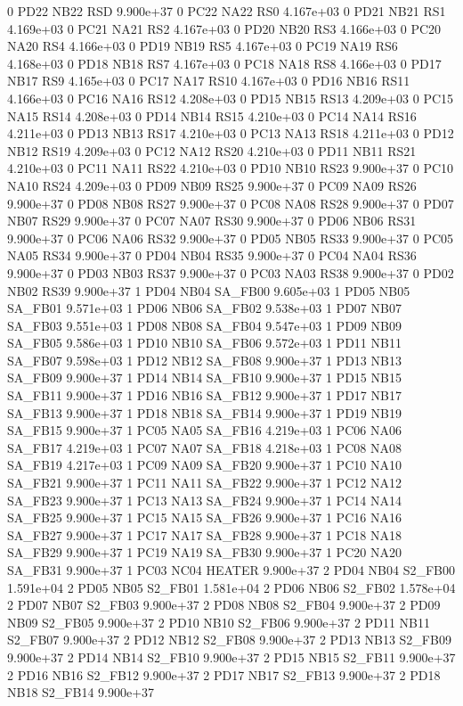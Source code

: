 0 PD22 NB22 RSD 9.900e+37 
0 PC22 NA22 RS0 4.167e+03 
0 PD21 NB21 RS1 4.169e+03 
0 PC21 NA21 RS2 4.167e+03 
0 PD20 NB20 RS3 4.166e+03 
0 PC20 NA20 RS4 4.166e+03 
0 PD19 NB19 RS5 4.167e+03 
0 PC19 NA19 RS6 4.168e+03 
0 PD18 NB18 RS7 4.167e+03 
0 PC18 NA18 RS8 4.166e+03 
0 PD17 NB17 RS9 4.165e+03 
0 PC17 NA17 RS10 4.167e+03 
0 PD16 NB16 RS11 4.166e+03 
0 PC16 NA16 RS12 4.208e+03 
0 PD15 NB15 RS13 4.209e+03 
0 PC15 NA15 RS14 4.208e+03 
0 PD14 NB14 RS15 4.210e+03 
0 PC14 NA14 RS16 4.211e+03 
0 PD13 NB13 RS17 4.210e+03 
0 PC13 NA13 RS18 4.211e+03 
0 PD12 NB12 RS19 4.209e+03 
0 PC12 NA12 RS20 4.210e+03 
0 PD11 NB11 RS21 4.210e+03 
0 PC11 NA11 RS22 4.210e+03 
0 PD10 NB10 RS23 9.900e+37 
0 PC10 NA10 RS24 4.209e+03 
0 PD09 NB09 RS25 9.900e+37 
0 PC09 NA09 RS26 9.900e+37 
0 PD08 NB08 RS27 9.900e+37 
0 PC08 NA08 RS28 9.900e+37 
0 PD07 NB07 RS29 9.900e+37 
0 PC07 NA07 RS30 9.900e+37 
0 PD06 NB06 RS31 9.900e+37 
0 PC06 NA06 RS32 9.900e+37 
0 PD05 NB05 RS33 9.900e+37 
0 PC05 NA05 RS34 9.900e+37 
0 PD04 NB04 RS35 9.900e+37 
0 PC04 NA04 RS36 9.900e+37 
0 PD03 NB03 RS37 9.900e+37 
0 PC03 NA03 RS38 9.900e+37 
0 PD02 NB02 RS39 9.900e+37 
1 PD04 NB04 SA_FB00 9.605e+03 
1 PD05 NB05 SA_FB01 9.571e+03 
1 PD06 NB06 SA_FB02 9.538e+03 
1 PD07 NB07 SA_FB03 9.551e+03 
1 PD08 NB08 SA_FB04 9.547e+03 
1 PD09 NB09 SA_FB05 9.586e+03 
1 PD10 NB10 SA_FB06 9.572e+03 
1 PD11 NB11 SA_FB07 9.598e+03 
1 PD12 NB12 SA_FB08 9.900e+37 
1 PD13 NB13 SA_FB09 9.900e+37 
1 PD14 NB14 SA_FB10 9.900e+37 
1 PD15 NB15 SA_FB11 9.900e+37 
1 PD16 NB16 SA_FB12 9.900e+37 
1 PD17 NB17 SA_FB13 9.900e+37 
1 PD18 NB18 SA_FB14 9.900e+37 
1 PD19 NB19 SA_FB15 9.900e+37 
1 PC05 NA05 SA_FB16 4.219e+03 
1 PC06 NA06 SA_FB17 4.219e+03 
1 PC07 NA07 SA_FB18 4.218e+03 
1 PC08 NA08 SA_FB19 4.217e+03 
1 PC09 NA09 SA_FB20 9.900e+37 
1 PC10 NA10 SA_FB21 9.900e+37 
1 PC11 NA11 SA_FB22 9.900e+37 
1 PC12 NA12 SA_FB23 9.900e+37 
1 PC13 NA13 SA_FB24 9.900e+37 
1 PC14 NA14 SA_FB25 9.900e+37 
1 PC15 NA15 SA_FB26 9.900e+37 
1 PC16 NA16 SA_FB27 9.900e+37 
1 PC17 NA17 SA_FB28 9.900e+37 
1 PC18 NA18 SA_FB29 9.900e+37 
1 PC19 NA19 SA_FB30 9.900e+37 
1 PC20 NA20 SA_FB31 9.900e+37 
1 PC03 NC04 HEATER 9.900e+37 
2 PD04 NB04 S2_FB00 1.591e+04 
2 PD05 NB05 S2_FB01 1.581e+04 
2 PD06 NB06 S2_FB02 1.578e+04 
2 PD07 NB07 S2_FB03 9.900e+37 
2 PD08 NB08 S2_FB04 9.900e+37 
2 PD09 NB09 S2_FB05 9.900e+37 
2 PD10 NB10 S2_FB06 9.900e+37 
2 PD11 NB11 S2_FB07 9.900e+37 
2 PD12 NB12 S2_FB08 9.900e+37 
2 PD13 NB13 S2_FB09 9.900e+37 
2 PD14 NB14 S2_FB10 9.900e+37 
2 PD15 NB15 S2_FB11 9.900e+37 
2 PD16 NB16 S2_FB12 9.900e+37 
2 PD17 NB17 S2_FB13 9.900e+37 
2 PD18 NB18 S2_FB14 9.900e+37 
